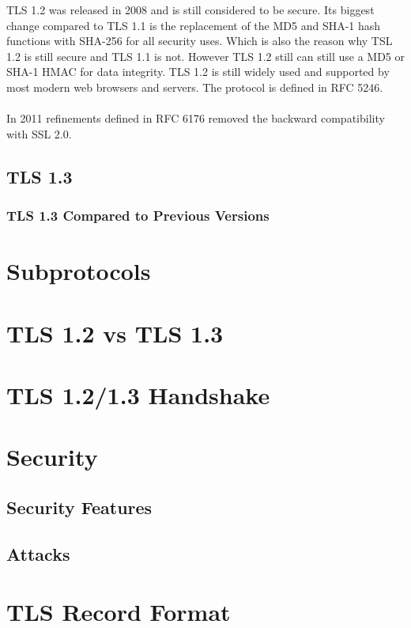 \documentclass[11pt]{scrartcl} %
\begin{document}
TLS 1.2 was released in 2008 and is still considered to be secure. Its biggest change compared to TLS 1.1 is the replacement of the MD5 and SHA-1 hash functions with SHA-256 for all security uses. Which is also the reason why TSL 1.2 is still secure and TLS 1.1 is not. However TLS 1.2 still can still use a MD5 or SHA-1 HMAC for data integrity. TLS 1.2 is still widely used and supported by most modern web browsers and servers. The protocol is defined in RFC 5246.
\\\\
In 2011 refinements defined in RFC 6176 removed the backward compatibility with SSL 2.0.

\subsection{TLS 1.3}

\subsubsection{TLS 1.3 Compared to Previous Versions}

\section{Subprotocols}

\section{TLS 1.2 vs TLS 1.3}

\section{TLS 1.2/1.3 Handshake}

\section{Security}

\subsection{Security Features}

\subsection{Attacks}

\section{TLS Record Format}
\end{document}
